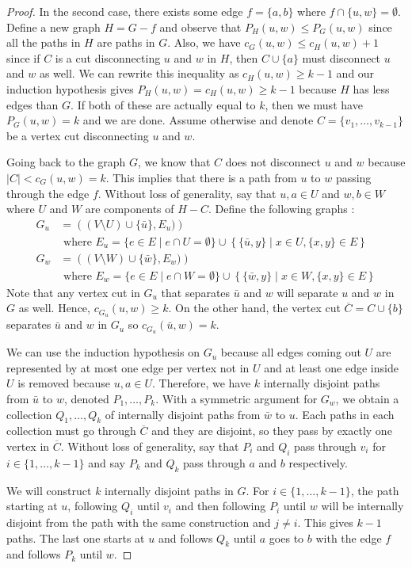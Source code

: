 \documentclass{tufte-handout}
\newcommand{\bra}[1]{\left(#1\right)}
\theoremstyle{definition}
\theoremstyle{remark}
\begin{document}
\begin{proof}
	In the second case, there exists some edge $f = \{a,b\}$ where $f \cap \{u,w\} = \emptyset$. Define a new graph $H = G-f$ and observe that $P_H(u,w) \leq P_G(u,w)$ since all the paths in $H$ are paths in $G$. Also, we have $c_G(u,w) \leq c_H(u,w) + 1$ since if $C$ is a cut disconnecting $u$ and $w$ in $H$, then $C\cup \{a\}$ must disconnect $u$ and $w$ as well. We can rewrite this inequality as $c_H(u,w) \geq k-1$ and our induction hypothesis gives $P_H(u,w) = c_H(u,w) \geq k-1$ because $H$ has less edges than $G$. If both of these are actually equal to $k$, then we must have $P_G(u,w) = k$ and we are done. Assume otherwise and denote $C = \{v_1, \dots, v_{k-1}\}$ be a vertex cut disconnecting $u$ and $w$.
	
	Going back to the graph $G$, we know that $C$ does not disconnect $u$ and $w$ because $|C| < c_G(u,w) = k$. This implies that there is a path from $u$ to $w$ passing through the edge $f$. Without loss of generality, say that $u,a \in U$ and $w,b \in W$ where $U$ and $W$ are components of $H-C$. Define the following graphs :
	\begin{align*}
		G_u &= \bra{ (V \setminus U)\cup \{\bar{u}\}, E_u)} \\&\mbox{ where } E_u = \{ e \in E \mid e \cap U = \emptyset \} \cup \left\{\{\bar{u},y\} \mid x \in U, \{x,y\} \in E \right\}\\
		G_w &= \bra{ (V \setminus W)\cup \{\bar{w}\}, E_w)} \\&\mbox{ where } E_w = \{ e \in E \mid e \cap W = \emptyset \} \cup \left\{\{\bar{w},y\} \mid x \in W, \{x,y\} \in E \right\}
	\end{align*}
	 Note that any vertex cut in $G_u$ that separates $\bar{u}$ and $w$ will separate $u$ and $w$ in $G$ as well. Hence, $c_{G_u}(u,w) \geq k$. On the other hand, the vertex cut $\overline{C} = C \cup \{b\}$ separates $\bar{u}$ and $w$ in $G_u$ so $c_{G_u}(\bar{u}, w) =k$.
	 
	 We can use the induction hypothesis on $G_u$ because all edges coming out $U$ are represented by at most one edge per vertex not in $U$ and at least one edge inside $U$ is removed because $u, a\in U$. Therefore, we have $k$ internally disjoint paths from $\bar{u}$ to $w$, denoted $P_1, \dots, P_k$. With a symmetric argument for $G_w$, we obtain a collection $Q_1, \dots, Q_k$ of internally disjoint paths from $\bar{w}$ to $u$. Each paths in each collection must go through $\overline{C}$ and they are disjoint, so they pass by exactly one vertex in $\overline{C}$. Without loss of generality, say that $P_i$ and $Q_i$ pass through $v_i$ for $i \in \{1,\dots, k-1\}$ and say $P_k$ and $Q_k$ pass through $a$ and $b$ respectively.
	 
	 We will construct $k$ internally disjoint paths in $G$. For $i \in \{1,\dots, k-1\}$, the path starting at $u$, following $Q_i$ until $v_i$ and then following $P_i$ until $w$ will be internally disjoint from the path with the same construction and $j \neq i$. This gives $k-1$ paths. The last one starts at $u$ and follows $Q_k$ until $a$ goes to $b$ with the edge $f$ and follows $P_k$ until $w$.
\end{proof}
\end{document}
